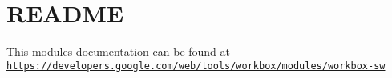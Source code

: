 \chapter{README}
\hypertarget{md_node__modules_2workbox-sw_2README}{}\label{md_node__modules_2workbox-sw_2README}
This module\textquotesingle{}s documentation can be found at \href{https://developers.google.com/web/tools/workbox/modules/workbox-sw}{\texttt{ https\+://developers.\+google.\+com/web/tools/workbox/modules/workbox-\/sw}} 